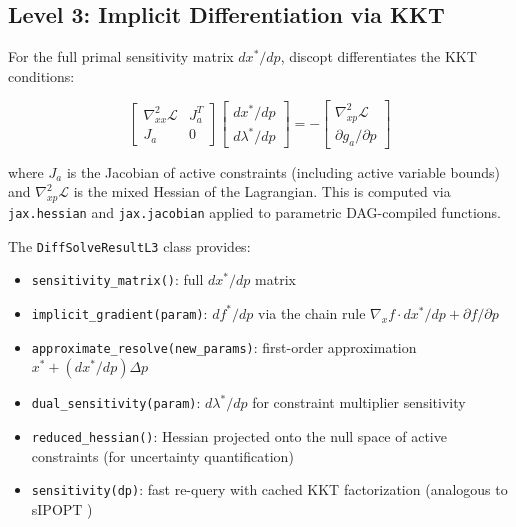 \documentclass[12pt,preprint]{article}
\begin{document}
\subsection{Level 3: Implicit Differentiation via KKT}
\label{org-level-3-implicit-differentiation-via-kkt}
For the full primal sensitivity matrix $dx^*/dp$, discopt differentiates the KKT conditions:


\begin{equation}
\begin{bmatrix}
\nabla^2_{xx}\mathcal{L} & J_a^T \\
J_a & 0
\end{bmatrix}
\begin{bmatrix}
dx^*/dp \\
d\lambda^*/dp
\end{bmatrix}
=
-\begin{bmatrix}
\nabla^2_{xp}\mathcal{L} \\
\partial g_a / \partial p
\end{bmatrix}
\end{equation}


where $J_a$ is the Jacobian of active constraints (including active variable bounds) and $\nabla^2_{xp}\mathcal{L}$ is the mixed Hessian of the Lagrangian. This is computed via \texttt{jax.hessian} and \texttt{jax.jacobian} applied to parametric DAG-compiled functions.


The \texttt{DiffSolveResultL3} class provides:


\begin{itemize}
\item \texttt{sensitivity\_matrix()}: full $dx^*/dp$ matrix

\item \texttt{implicit\_gradient(param)}: $df^*/dp$ via the chain rule $\nabla_x f \cdot dx^*/dp + \partial f/\partial p$

\item \texttt{approximate\_resolve(new\_params)}: first-order approximation $x^* + (dx^*/dp) \Delta p$

\item \texttt{dual\_sensitivity(param)}: $d\lambda^*/dp$ for constraint multiplier sensitivity

\item \texttt{reduced\_hessian()}: Hessian projected onto the null space of active constraints (for uncertainty quantification)

\item \texttt{sensitivity(dp)}: fast re-query with cached KKT factorization (analogous to sIPOPT \cite{Pirnay2012})

\end{itemize}
\end{document}

